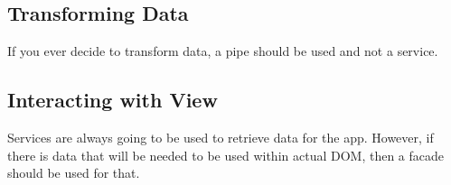 \subsection{ Transforming Data }
If you ever decide to transform data, a pipe should be used and not a service.
\subsection{ Interacting with View }
Services are always going to be used to retrieve data for the app. However,
if there is data that will be needed to be used within actual DOM, then a
facade should be used for that.  
